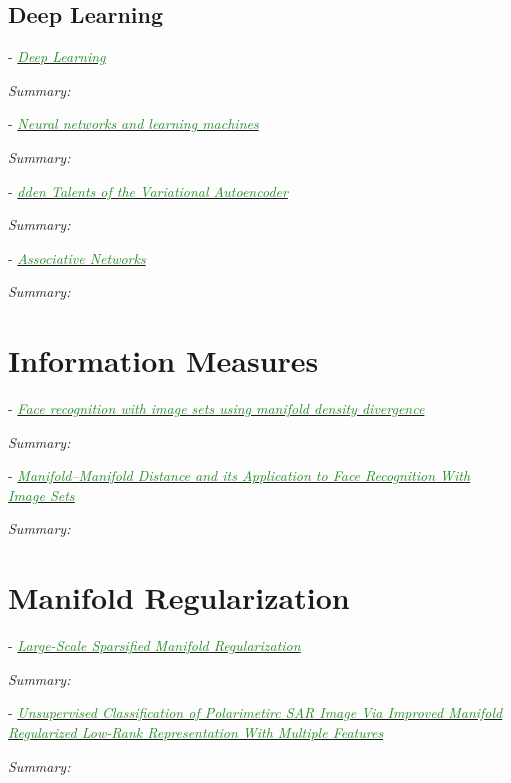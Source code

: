 \documentclass[]{article}
\newcommand{\paperentry}[4]{
            \hangindent=1cm
            \cite{#1} - \href{run:../References/#3}{\textcolor{ForestGreen}{\textit{#2}}}
            
            \noindent            
            \begin{minipage}[t]{0.1\linewidth}\hfill\end{minipage}
            \begin{minipage}[t]{0.8\linewidth}\textcolor{NavyBlue}{{\textit{Summary:}}}#4\end{minipage}
            \vspace{.25cm}
          }
\begin{document}
	\subsection{Deep Learning}
	
		\paperentry{Goodfellow2016DeepLearning}
		{Deep Learning}
		{Manifold_Representation_Learning/Autoencoders/Goodfellow2016DeepLearning.pdf}
		{}
		
		\paperentry{Haykin2009NeuralNetworks}
		{Neural networks and learning machines}
		{Manifold_Representation_Learning/Autoencoders/Haykin2009NeuralNetworks.pdf}
		{}
		
		\paperentry{Dai2017VariationalAutoencoder}
		{dden Talents of the Variational Autoencoder}
		{Manifold_Representation_Learning/Autoencoders/Dai2017VariationalAutoencoder.pdf}
		{}
		
		\paperentry{Rojas1996AssociativeNetworks}
		{Associative Networks}
		{Manifold_Representation_Learning/Autoencoders/Rojas1996AssociativeNetworks.pdf}
		{}

\section{Information Measures}

	\paperentry{Arandjelovic2005FaceRecManifoldDensityDivergence}
	{Face recognition with image sets using manifold density divergence}
	{Manifold_Representation_Learning/Information/Arandjelovic2005FaceRecManifoldDensityDivergence.pdf}
	{}
	
	\paperentry{Wang2008ManifoldManifoldDistance}
	{Manifold–Manifold Distance and its Application to Face Recognition With Image Sets}
	{Manifold_Representation_Learning/Information/Wang2008ManifoldManifoldDistance.pdf}
	{}
	

	
\section{Manifold Regularization}
	\paperentry{Tsang2007ManifoldRegularization}
	{Large-Scale Sparsified Manifold Regularization}
	{Manifold_Representation_Learning/ManifoldRegularization/Tsang2007ManifoldRegularization.pdf}
	{}
	
	\paperentry{Ren2017ManRegSAR}
	{Unsupervised Classification of Polarimetirc SAR Image Via Improved Manifold Regularized Low-Rank Representation With Multiple Features}
	{Manifold_Representation_Learning/ManifoldRegularization/Ren2017ManRegSAR.pdf}
	{}
	
\end{document}
